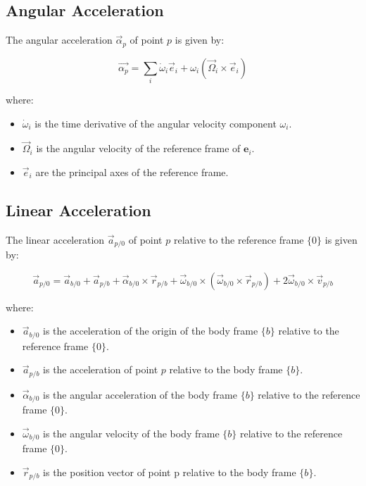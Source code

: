 \subsection{Angular Acceleration}

The angular acceleration \( \vec{\alpha}_{p} \) of point \( p \) is given by:

\[
\vec{\alpha_{p}} = \sum_{i} \dot{\omega}_i \vec{e}_i + \omega_i (\vec{\Omega}_i \times \vec{e}_i)
\]

where:
\begin{itemize}
    \item \( \dot{\omega}_i \) is the time derivative of the angular velocity component \( \omega_i \).
    \item \( \vec{\Omega}_i \) is the angular velocity of the reference frame of \( \mathbf{e}_i \).
    \item \( \vec{e}_i \) are the principal axes of the reference frame.
\end{itemize}

\subsection{Linear Acceleration}

The linear acceleration \( \vec{a}_{p/0} \) of point \( p \) relative to the reference frame \( \{0\} \) is given by:

\[
\vec{a}_{p/0} = \vec{a}_{b/0} + \vec{a}_{p/b} + \vec{\alpha}_{b/0} \times \vec{r}_{p/b} + \vec{\omega}_{b/0} \times (\vec{\omega}_{b/0} \times \vec{r}_{p/b}) + 2 \vec{\omega}_{b/0} \times \vec{v}_{p/b}
\]

where:
\begin{itemize}
    \item \( \vec{a}_{b/0} \) is the acceleration of the origin of the body frame \( \{b\} \) relative to the reference frame \( \{0\} \).
    \item \( \vec{a}_{p/b} \) is the acceleration of point \( p \) relative to the body frame \( \{b\} \).
    \item \( \vec{\alpha}_{b/0} \) is the angular acceleration of the body frame \( \{b\} \) relative to the reference frame \( \{0\} \).
    \item \( \vec{\omega}_{b/0} \) is the angular velocity of the body frame \( \{b\} \) relative to the reference frame \( \{0\} \).
    \item \( \vec{r}_{p/b} \) is the position vector of point p relative to the body frame \( \{b\} \).
\end{itemize}

